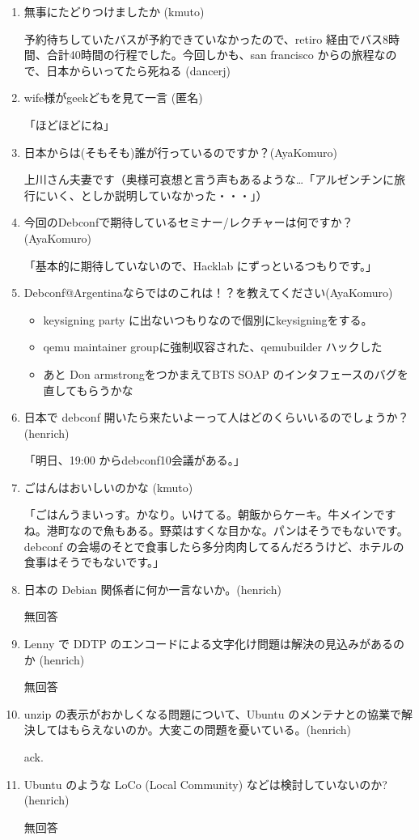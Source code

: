 \documentclass[mingoth,a4paper]{jsarticle}
\begin{document}
\begin{enumerate}
\item 無事にたどりつけましたか (kmuto)

  予約待ちしていたバスが予約できていなかったので、retiro 経由でバス8時間、合計40時間の行程でした。今回しかも、san francisco からの旅程なので、日本からいってたら死ねる (dancerj) 

\item wife様がgeekどもを見て一言 (匿名)

  「ほどほどにね」 

\item 日本からは(そもそも)誰が行っているのですか？(AyaKomuro)

   上川さん夫妻です（奥様可哀想と言う声もあるような…「アルゼンチンに旅行にいく、としか説明していなかった・・・」） 

\item 今回のDebconfで期待しているセミナー/レクチャーは何ですか？(AyaKomuro)

   「基本的に期待していないので、Hacklab にずっといるつもりです。」 

\item Debconf@Argentinaならではのこれは！？を教えてください(AyaKomuro)

  \begin{itemize}
    \item keysigning party に出ないつもりなので個別にkeysigningをする。
    \item qemu maintainer groupに強制収容された、qemubuilder ハックした
    \item あと Don armstrongをつかまえてBTS SOAP のインタフェースのバグを直してもらうかな
  \end{itemize} 
\item 日本で debconf 開いたら来たいよーって人はどのくらいいるのでしょうか？ (henrich)
   
  「明日、19:00 からdebconf10会議がある。」 

\item ごはんはおいしいのかな (kmuto)

   「ごはんうまいっす。かなり。いけてる。朝飯からケーキ。牛メインですね。港町なので魚もある。野菜はすくな目かな。パンはそうでもないです。debconf の会場のそとで食事したら多分肉肉してるんだろうけど、ホテルの食事はそうでもないです。」 
\item 日本の Debian 関係者に何か一言ないか。(henrich)

  無回答
\item Lenny で DDTP のエンコードによる文字化け問題は解決の見込みがあるのか (henrich)

  無回答
\item unzip の表示がおかしくなる問題について、Ubuntu のメンテナとの協業で解決してはもらえないのか。大変この問題を憂いている。(henrich)
       
    ack. 
\item Ubuntu のような LoCo (Local Community) などは検討していないのか? (henrich) 
   
  無回答
\end{enumerate}
\end{document}
